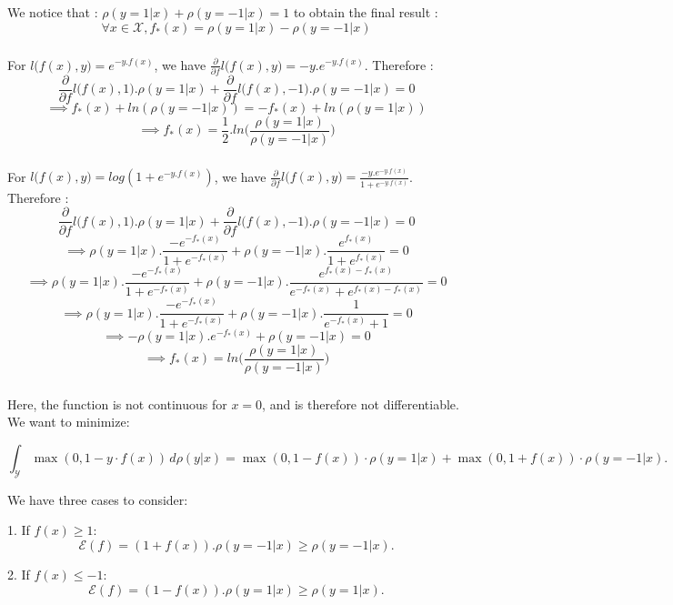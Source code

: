 \documentclass[final,3p,times,12pt]{article}
\begin{document}
We notice that : $\rho(y=1|x) + \rho(y=-1|x) = 1$ to obtain the final result :
\[ \forall x \in \mathcal{X},  f_*(x) = \rho(y=1|x) - \rho(y=-1|x)
\] 

\subsubsection{} 

For $l\big(f(x),y\big) = e^{-y.f(x)}$, we have $\frac{\partial}{\partial f} l\big(f(x),y\big) = -y.e^{-y.f(x)}$. Therefore : 
\[ \frac{\partial}{\partial f} l\big(f(x),1\big).\rho(y=1|x) + \frac{\partial}{\partial f} l\big(f(x),-1\big).\rho(y=-1|x) = 0  \]
\[\implies f_*(x)+ln(\rho(y=-1|x)) = -f_*(x)+ln(\rho(y=1|x))
\]
\[\implies f_*(x) = \frac{1}{2}.ln\big(\frac{\rho(y=1|x)}{\rho(y=-1|x)}\big)
\] 

\subsubsection{} 
For $l\big(f(x),y\big) = log(1+e^{-y.f(x)})$, we have $\frac{\partial}{\partial f} l\big(f(x),y\big) = \frac{-y.e^{-y.f(x)}}{1+e^{-y.f(x)}}$. Therefore : 
\[ \frac{\partial}{\partial f} l\big(f(x),1\big).\rho(y=1|x) + \frac{\partial}{\partial f} l\big(f(x),-1\big).\rho(y=-1|x) = 0  \]
\[\implies \rho(y=1|x).\frac{-e^{-f_*(x)}}{1+e^{-f_*(x)}} + \rho(y=-1|x).\frac{e^{f_*(x)}}{1+e^{f_*(x)}} = 0
\]
\[\implies \rho(y=1|x).\frac{-e^{-f_*(x)}}{1+e^{-f_*(x)}} + \rho(y=-1|x).\frac{e^{f_*(x)-f_*(x)}}{e^{-f_*(x)}+e^{f_*(x)-f_*(x)}} = 0
\]
\[\implies \rho(y=1|x).\frac{-e^{-f_*(x)}}{1+e^{-f_*(x)}} + \rho(y=-1|x).\frac{1}{e^{-f_*(x)}+1} = 0
\]
\[\implies -\rho(y=1|x).e^{-f_*(x)} + \rho(y=-1|x) = 0
\]
\[\implies f_*(x) = ln\big(\frac{\rho(y=1|x)}{\rho(y=-1|x)}\big)
\]

\subsubsection{} 
Here, the function is not continuous for \(x=0\), and is therefore not differentiable. We want to minimize:

\[
\int_{\mathcal{Y}} \max(0, 1 - y \cdot f(x)) \, d\rho(y|x) 
= \max(0, 1 - f(x)) \cdot \rho(y=1|x) + \max(0, 1 + f(x)) \cdot \rho(y=-1|x).
\]

We have three cases to consider:

1. If \(f(x) \geq 1\):
   \[
   \mathcal{E}(f) = (1 + f(x)).\rho(y=-1|x) \geq \rho(y=-1|x).
   \]

2. If \(f(x) \leq -1\):
   \[
   \mathcal{E}(f) = (1 - f(x)).\rho(y=1|x) \geq \rho(y=1|x).
   \]
\end{document}
